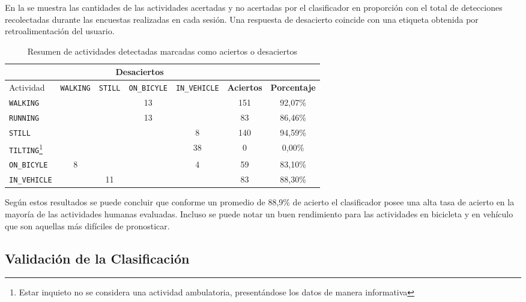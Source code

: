 En la  se muestra las cantidades de las actividades
acertadas y no acertadas por el clasificador  en proporción
con el total de detecciones recolectadas durante las encuestas realizadas
en cada sesión. Una respuesta de desacierto coincide con una etiqueta
obtenida por retroalimentación del usuario.

\begin{table}[h]
\begin{centering}
\begin{tabular}{|l|c|c|c|c|c|c|}
\cline{2-5} 
\multicolumn{1}{l|}{} & \multicolumn{4}{c|}{\textbf{Desaciertos}} & \multicolumn{1}{c}{} & \multicolumn{1}{c}{}\tabularnewline
\hline 
Actividad & \texttt{\footnotesize{}WALKING} & \texttt{\footnotesize{}STILL} & \texttt{\footnotesize{}ON\_BICYLE} & \texttt{\footnotesize{}IN\_VEHICLE} & \textbf{\small{}Aciertos} & \textbf{\small{}Porcentaje}\tabularnewline
\hline 
\hline 
\texttt{\footnotesize{}WALKING} &  &  & 13 &  & 151 & 92,07\%\tabularnewline
\hline 
\texttt{\footnotesize{}RUNNING} &  &  & 13 &  & 83 & 86,46\%\tabularnewline
\hline 
\texttt{\footnotesize{}STILL} &  &  &  & 8 & 140 & 94,59\%\tabularnewline
\hline 
\texttt{\footnotesize{}TILTING}\emph{\footnotesize{}}\footnote{{\footnotesize{}Estar inquieto no se considera una actividad ambulatoria,
presentándose los datos de manera informativa}} &  &  &  & 38 & 0 & 0,00\%\tabularnewline
\hline 
\texttt{\footnotesize{}ON\_BICYLE} & 8 &  &  & 4 & 59 & 83,10\%\tabularnewline
\hline 
\texttt{\footnotesize{}IN\_VEHICLE} &  & 11 &  &  & 83 & 88,30\%\tabularnewline
\hline 
\end{tabular}
\par\end{centering}
\caption[Aciertos y desaciertos de actividades humanas detectadas]{\label{tab6:vencuesta}Resumen de actividades detectadas marcadas
como aciertos o desaciertos}
\end{table}

Según estos resultados se puede concluir que conforme un promedio
de 88,9\% de acierto el clasificador posee una alta tasa de acierto
en la mayoría de las actividades humanas evaluadas. Incluso se puede
notar un buen rendimiento para las actividades en bicicleta y en vehículo
que son aquellas más difíciles de pronosticar.

\subsection{Validación de la Clasificación}

